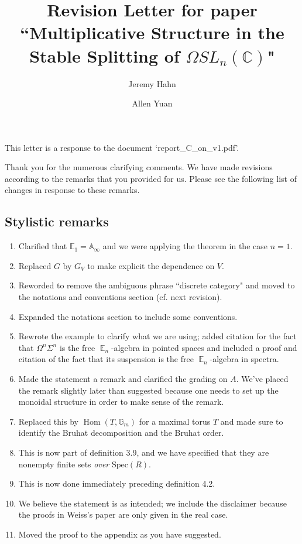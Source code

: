 \documentclass[reqno, oneside]{amsart}
\theoremstyle{definition}
\theoremstyle{plain}
\DeclareMathOperator{\Hom}{\text{Hom}}
\DeclareMathOperator{\E}{\mathbb{E}}
\begin{document}
\title{Revision Letter for paper ``Multiplicative Structure in the Stable Splitting of $\Omega SL_n(\mathbb{C})$"}
\author{Jeremy Hahn}
\address{Department of Mathematics, Harvard University, Cambridge, MA 02138}

\author{Allen Yuan}
\address{Department of Mathematics, Massachusetts Institute of Technology, Cambridge, MA 02139}



\maketitle

This letter is a response to the document `report\_C\_on\_v1.pdf'.

Thank you for the numerous clarifying comments.  We have made revisions according to the remarks that you provided for us.  Please see the following list of changes in response to these remarks.  

\subsection{Stylistic remarks}
\begin{enumerate}
\item Clarified that $\mathbb{E}_1 = \mathbb{A}_{\infty}$ and we were applying the theorem in the case $n=1$.  
\item Replaced $G$ by $G_V$ to make explicit the dependence on $V$.  
\item Reworded to remove the ambiguous phrase ``discrete category" and moved to the notations and conventions section (cf. next revision).
\item Expanded the notations section to include some conventions.  
\item Rewrote the example to clarify what we are using; added citation for the fact that $\Omega^n \Sigma^n$ is the free $\E_n$-algebra in pointed spaces and included a proof and citation of the fact that its suspension is the free $\E_n$-algebra in spectra.   
\item Made the statement a remark and clarified the grading on $A$.  We've placed the remark slightly later than suggested because one needs to set up the monoidal structure in order to make sense of the remark.  
\item Replaced this by $\Hom(T, \mathbb{G}_m)$ for a maximal torus $T$ and made sure to identify the Bruhat decomposition and the Bruhat order.  
\item  This is now part of definition 3.9, and we have specified that they are nonempty finite sets \emph{over} $\mathrm{Spec}(R)$.  
\item This is now done immediately preceding definition 4.2.  
\item We believe the statement is as intended; we include the disclaimer because the proofs in Weiss's paper are only given in the real case.  
\item Moved the proof to the appendix as you have suggested.  
\end{enumerate}
\end{document}
